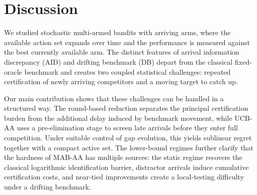\documentclass[
  12pt]{article}
\begin{document}
\section{Discussion}\label{sec:Discussion}

We studied stochastic multi-armed bandits with arriving arms, where the available action
set expands over time and the performance is measured against the best currently available arm. The distinct features of arrival information discrepancy (AID) and drifting benchmark (DB) depart from the classical fixed-oracle benchmark and creates two
coupled statistical challenges: repeated certification of newly arriving competitors and a moving target to catch up.

Our main contribution shows that these challenges can be handled in a structured way. The round-based reduction separates the principal certification burden from the additional delay induced by benchmark movement, while UCB-AA uses a pre-elimination stage to screen late arrivals before they enter full competition. Under suitable control of gap evolution, this yields sublinear regret together with a compact active set. The lower-bound regimes further clarify that the hardness of MAB-AA has multiple sources: the static regime recovers the classical logarithmic identification barrier, distractor arrivals induce cumulative certification costs, and near-tied improvements create a local-testing difficulty under a drifting benchmark.


\end{document}
